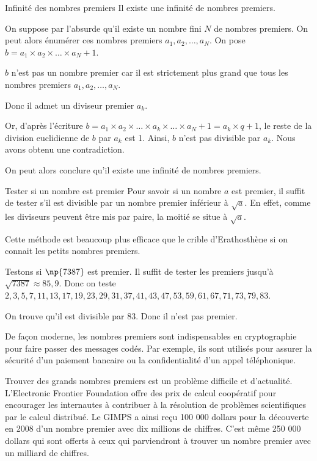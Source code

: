 \documentclass[10pt,a4paper,openany,twoside,prof]{book}
\begin{document}
\begin{prop}{Infinité des nombres premiers}{}
	Il existe une infinité de nombres premiers.
\end{prop}

\begin{dem}{}{}
	On suppose par l'absurde qu'il existe un nombre fini $N$ de nombres premiers. On peut alors énumérer ces nombres premiers $a_1, a_2, \dots, a_N$. On pose $b = a_1\times a_2 \times \dots \times a_N+1$. 
	
	$b$ n'est pas un nombre premier car il est strictement plus grand que tous les nombres premiers $a_1, a_2, \dots, a_N$.

	Donc il admet un diviseur premier $a_k$. 

	Or, d'après l'écriture $b = a_1\times a_2 \times \dots \times a_k \times \dots  \times a_N+1 = a_k\times q +1$, le reste de la division euclidienne de $b$ par $a_k$ est 1. Ainsi, $b$ n'est pas divisible par $a_k$. Nous avons obtenu une contradiction.

	On peut alors conclure qu'il existe une infinité de nombres premiers.
\end{dem}

\begin{methode}{Tester si un nombre est premier}{}
  Pour savoir si un nombre $a$ est premier, il suffit de tester s'il est divisible par un nombre premier inférieur à $\sqrt{a}$. En effet, comme les diviseurs peuvent être mis par paire, la \og moitié\fg{} se situe à $\sqrt{a}$.

  Cette méthode est beaucoup plus efficace que le crible d'Erathosthène si on connait les petits nombres premiers.
\end{methode}

\begin{ex}{}{}
  Testons si $\np{7387}$ est premier. Il \og suffit\fg{} de tester les premiers jusqu'à $\sqrt{7387}\approx 85,9$. Donc on teste $2, 3, 5, 7, 11, 13, 17, 19, 23, 29, 31, 37, 41, 43, 47, 53, 59, 61, 67, 71, 73, 79, 83$.

  On trouve qu'il est divisible par 83. Donc il n'est pas premier.
\end{ex}

\begin{histoire}{}{}
	De façon moderne, les nombres premiers sont indispensables en cryptographie pour faire passer des messages codés. Par exemple, ils sont utilisés pour assurer la sécurité d'un paiement bancaire ou la confidentialité d'un appel téléphonique.

	Trouver des grands nombres premiers est un problème difficile et d'actualité. L'Electronic Frontier Foundation offre des prix de calcul coopératif pour encourager les internautes à contribuer à la résolution de problèmes scientifiques par le calcul distribué. Le GIMPS a ainsi reçu 100 000 dollars pour la découverte en 2008 d'un nombre premier avec dix millions de chiffres. C'est même 250 000 dollars qui sont offerts à ceux qui parviendront à trouver un nombre premier avec un milliard de chiffres.
\end{histoire}
\end{document}
